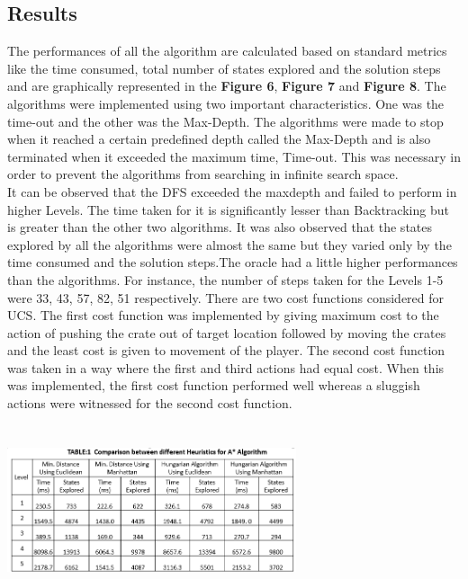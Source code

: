 \documentclass[10pt, final]{article}
\newcommand{\br}[1][.75]{\ \\[#1\baselineskip]}
\begin{document}
\begin{multicols}{2}
	\section{Results}
	The performances of all the algorithm are calculated based on standard metrics like the time consumed, total number of states explored and the solution steps and are graphically represented in the \textbf{Figure 6}, \textbf{Figure 7} and \textbf{Figure 8}. The algorithms were implemented using two important characteristics. One was the time-out and the other was the Max-Depth. The algorithms were made to stop when it reached a certain predefined depth called the Max-Depth and is also terminated when it exceeded the maximum time, Time-out. This was necessary in order to prevent the algorithms from searching in infinite search space.\br
	It can be observed that the DFS exceeded the maxdepth and failed to perform in higher Levels. The time taken for it is significantly lesser than Backtracking but is greater than the other two algorithms. It was also observed that the states explored by all the algorithms were almost the same but they varied only by the time consumed and the solution steps.The oracle had a little higher performances than the algorithms. For instance, the number of steps taken for the Levels 1-5 were 33, 43, 57, 82, 51 respectively.
	There are two cost functions considered for UCS. The first cost function was implemented by giving maximum cost to the action of pushing the crate out of target location followed by moving the crates and the least cost is given to movement of the player. The second cost function was taken in a way where the first and third actions had equal cost. When this was implemented, the first cost function performed well whereas a sluggish actions were witnessed for the second cost function. 
				\begin{center}
		\includegraphics[width=8.5cm, height=5cm]{Comp.png}
	\end{center}  \br

\end{multicols}
\end{document}
